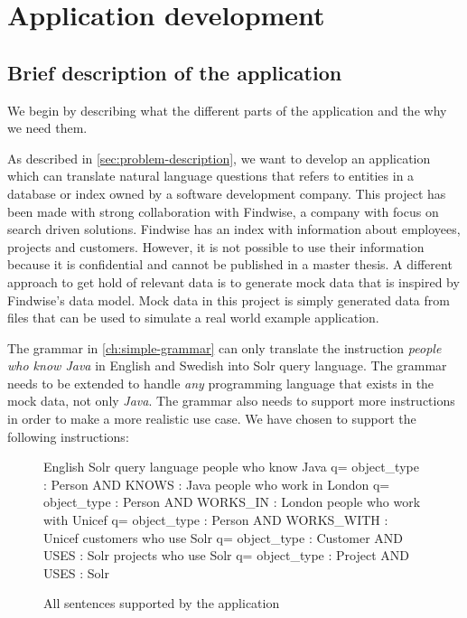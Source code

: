 \chapter{Application development}\label{ch:application-overview}

\section{Brief description of the application}

We begin by describing what the different parts of the application and the why we need them.

As described in \autoref{sec:problem-description}, we want to develop an application which can translate natural language questions that refers to entities in a database or index owned by a software development company. This project has been made with strong collaboration with Findwise, a company with focus on search driven solutions. Findwise has an index with information about employees, projects and customers. However, it is not possible to use their information because it is confidential and cannot be published in a master thesis. A different approach to get hold of relevant data is to generate mock data that is inspired by Findwise's data model. Mock data in this project is simply generated data from files that can be used to simulate a real world example application.

\label{sec:grammar-development}
The grammar in \autoref{ch:simple-grammar} can only translate the instruction \emph{people who know Java} in English and Swedish into Solr query language. The grammar needs to be extended to handle \emph{any} programming language that exists in the mock data, not only \emph{Java}. The grammar also needs to support more instructions in order to make a more realistic use case. We have chosen to support the following instructions:

\begin{figure}[H]
\begin{terminal}
English                        Solr query language
people who know Java           q= object_type : Person AND KNOWS : Java
people who work in London      q= object_type : Person AND WORKS_IN : London
people who work with Unicef    q= object_type : Person AND WORKS_WITH : Unicef
customers who use Solr         q= object_type : Customer AND USES : Solr
projects who use Solr          q= object_type : Project AND USES : Solr
\end{terminal}
\caption{All sentences supported by the application}\label{fig:suppported-sentences}
\end{figure}

